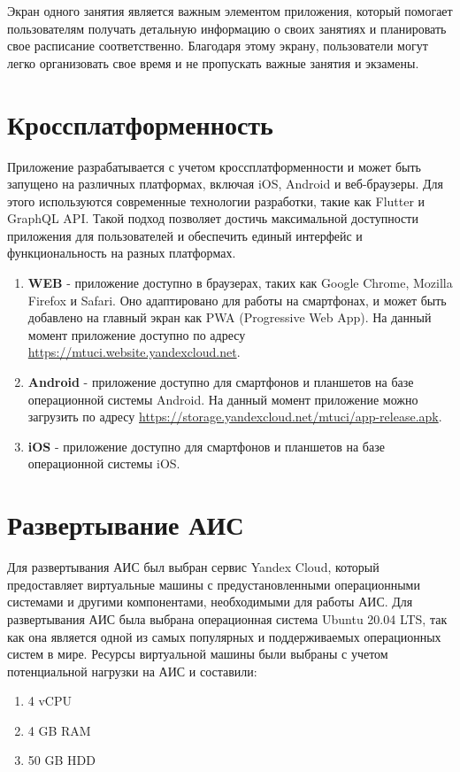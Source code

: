 Экран одного занятия является важным элементом приложения,
который помогает пользователям получать детальную информацию
о своих занятиях и планировать свое расписание соответственно.
Благодаря этому экрану, пользователи могут легко организовать
свое время и не пропускать важные занятия и экзамены.

\section{Кроссплатформенность}
Приложение разрабатывается с учетом кроссплатформенности и может быть запущено на различных платформах,
включая iOS, Android и веб-браузеры.
Для этого используются современные технологии разработки, такие как Flutter и GraphQL API.
Такой подход позволяет достичь максимальной доступности приложения для пользователей и обеспечить единый
интерфейс и функциональность на разных платформах.

\begin{enumerate}
    \item \textbf{WEB} - приложение доступно в браузерах, таких как Google Chrome, Mozilla Firefox и Safari. 
    Оно адаптировано для работы на смартфонах, и может быть добавлено на главный экран как PWA (Progressive Web App).
    На данный момент приложение доступно по адресу \url{https://mtuci.website.yandexcloud.net}.
    \item \textbf{Android} - приложение доступно для смартфонов и планшетов на базе операционной системы Android.
    На данный момент приложение можно загрузить по адресу \url{https://storage.yandexcloud.net/mtuci/app-release.apk}.
    \item \textbf{iOS} - приложение доступно для смартфонов и планшетов на базе операционной системы iOS.
\end{enumerate}

\section{Развертывание АИС}
Для развертывания АИС был выбран сервис Yandex Cloud, который предоставляет виртуальные машины 
с предустановленными операционными системами и другими компонентами, необходимыми для работы АИС.
Для развертывания АИС была выбрана операционная система Ubuntu 20.04 LTS, так как она является 
одной из самых популярных и поддерживаемых операционных систем в мире.
Ресурсы виртуальной машины были выбраны с учетом потенциальной нагрузки на АИС и составили:
\begin{enumerate}
    \item 4 vCPU
    \item 4 GB RAM
    \item 50 GB HDD
\end{enumerate}

